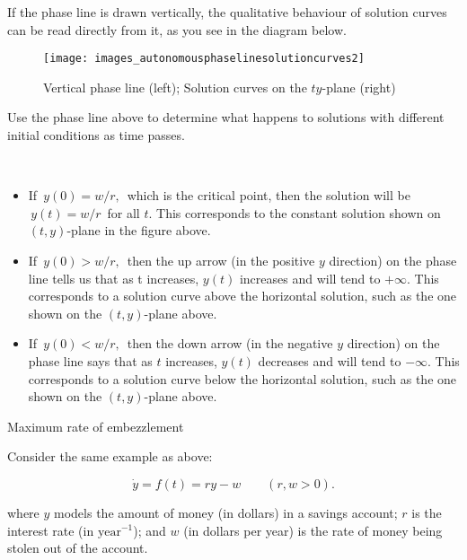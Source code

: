 \clearpage

If the phase line is drawn vertically, the qualitative behaviour of solution curves can be read directly from it, as you see in the diagram below.

\begin{figure}[ht!]
  \centering
  \texttt{[image: images\_autonomousphaselinesolutioncurves2]}
  \caption{Vertical phase line (left); Solution curves on the $ty$-plane (right)}
\end{figure}

\begin{example}
  Use the phase line above to determine what happens to solutions
  with different initial conditions as time passes.
\end{example}

\Solution \\

\begin{itemize}
\item If $\, y(0) = w/r,\,$ which is the critical point,
  then the solution will be $\, y(t)=w/r\,$ for all $t$.
  This corresponds to the constant solution shown on $(t,y)$-plane in the figure above.
\item If $\, y(0)>w/r,\, $ then the up arrow (in the positive $y$ direction) on the phase line
  tells us that as t increases, $y(t)$ increases and will tend to $+ \infty$.
  This corresponds to a solution curve above the horizontal solution,
  such as the one shown on the $(t,y)$-plane above.
\item If $\, y(0)<w/r, \,$ then the down arrow (in the negative $y$ direction)
  on the phase line says that as $t$ increases, $y(t)$ decreases and
  will tend to $- \infty$.
  This corresponds to a solution curve below the horizontal solution,
  such as the one shown on the $(t,y)$-plane above.
\end{itemize}

\begin{exercise}
  Maximum rate of embezzlement
\end{exercise}

Consider the same example as above:

\begin{equation*}
  \dot y = f(t) = ry - w \qquad (r, w > 0). 
\end{equation*}

where $y$ models the amount of money (in dollars) in a savings account;
$r$ is the interest rate (in $\text{year}^{-1}$); and $w$ (in dollars per year) is
the rate of money being stolen out of the account.\\


